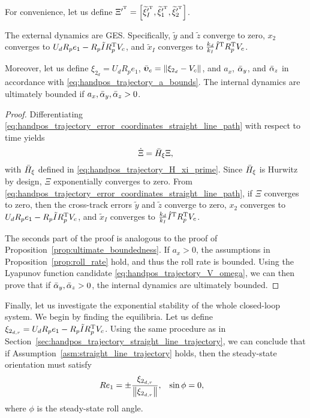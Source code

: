 For convenience, let us define $\Xi^{\prime^{\mathrm{T}}} = \left[\widetilde{\xi}_I^{\prime^{\mathrm{T}}}, \widetilde{\xi}_1^{\prime^{\mathrm{T}}}, \widetilde{\xi}_2^{\prime^{\mathrm{T}}}\right]$.
\begin{prop}
    The external dynamics are GES.
    Specifically, $\widetilde{y}$ and $\widetilde{z}$ converge to zero, $x_2$ converges to $U_d R_p e_1 - R_p \tilde{I} R_p^{\mathrm{T}} V_c$, and $\widetilde{x}_I$ converges to $\frac{k_d}{k_I} \hat{I}^{\mathrm{T}} R_p^{\mathrm{T}} V_c$.

    Moreover, let us define $\xi_{2_d} = U_d R_p e_1$, $\Bar{\bm{\upsilon}}_e = \left\|\xi_{2_d} - V_c\right\|$, and $a_x$, $\Bar{\alpha}_y$, and $\Bar{\alpha}_z$ in accordance with \eqref{eq:handpos_trajectory_a_bounds}.
    The internal dynamics are ultimately bounded if $a_x, \Bar{\alpha}_y, \Bar{\alpha}_z > 0$.
    \label{prop:straight_line_path}
\end{prop}
\begin{proof}
    Differentiating \eqref{eq:handpos_trajectory_error_coordinates_straight_line_path} with respect to time yields
    \begin{equation}
        \dot{\Xi} = \Bar{H}_{\xi} \Xi,
    \end{equation}
    with $\Bar{H}_{\xi}$ defined in \eqref{eq:handpos_trajectory_H_xi_prime}.
    Since $\Bar{H}_{\xi}$ is Hurwitz by design, $\Xi$ exponentially converges to zero.
    From \eqref{eq:handpos_trajectory_error_coordinates_straight_line_path}, if $\Xi$ converges to zero, then the cross-track errors $\widetilde{y}$ and $\widetilde{z}$ converge to zero, $x_2$ converges to $U_d R_p e_1 - R_p \tilde{I} R_p^{\mathrm{T}} V_c$, and $\widetilde{x}_I$ converges to $\frac{k_d}{k_I} \hat{I}^{\mathrm{T}} R_p^{\mathrm{T}} V_c$.

    The seconds part of the proof is analogous to the proof of Proposition~\ref{prop:ultimate_boundedness}.
    If $a_x > 0$, the assumptions in Proposition~\ref{prop:roll_rate} hold, and thus the roll rate is bounded.
    Using the Lyapunov function candidate \eqref{eq:handpos_trajectory_V_omega}, we can then prove that if $\Bar{\alpha}_y, \Bar{\alpha}_z > 0$, the internal dynamics are ultimately bounded.
\end{proof}

Finally, let us investigate the exponential stability of the whole closed-loop system.
We begin by finding the equilibria.
Let us define $\xi_{2_{d, r}} = U_d R_p e_1 - R_p \tilde{I} R_p^{\mathrm{T}} V_c$.
Using the same procedure as in Section~\ref{sec:handpos_trajectory_straight_line_trajectory}, we can conclude that if Assumption~\ref{asm:straight_line_trajectory} holds, then the steady-state orientation must satisfy
\begin{align}
    Re_1 &= \pm \frac{\xi_{2_{d, r}}}{\left\|\xi_{2_{d, r}}\right\|}, &
    \sin\phi &= 0,
\end{align}
where $\phi$ is the steady-state roll angle.

